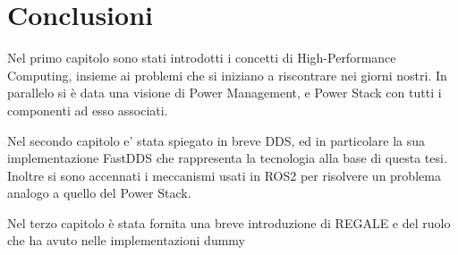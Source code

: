 \chapter{Conclusioni}

Nel primo capitolo sono stati introdotti i concetti di High-Performance Computing, insieme ai problemi che si iniziano a riscontrare nei giorni nostri. In parallelo si è data una visione di Power Management, e Power Stack con tutti i componenti ad esso associati.

Nel secondo capitolo e' stata spiegato in breve DDS, ed in particolare la sua implementazione FastDDS che rappresenta la tecnologia alla base di questa tesi. Inoltre si sono accennati i meccanismi usati in ROS2 per risolvere un problema analogo a quello del Power Stack.

Nel terzo capitolo è stata fornita una breve introduzione di REGALE e del ruolo che ha avuto nelle implementazioni dummy %


